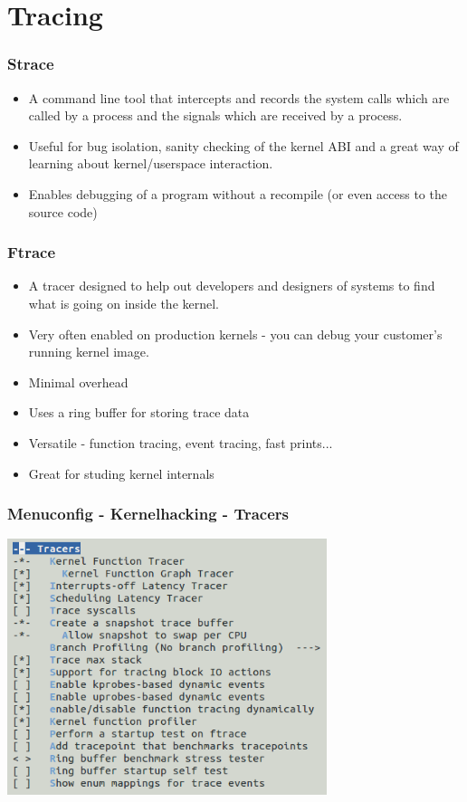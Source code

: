 \documentclass{beamer}
\begin{document}
\section{Tracing}

\begin{frame}
\frametitle{Strace}
\begin{itemize}
	\item A command line tool that intercepts and records the system calls which are called by a process and the signals which are received by a process.
	\item Useful for bug isolation, sanity checking of the kernel ABI and
a great way of learning about kernel/userspace interaction.
	\item Enables debugging of a program without a recompile (or even access to the source code)
\end{itemize}
\end{frame}

\begin{frame}
\frametitle{Ftrace}
\begin{itemize}
	\item A tracer designed to help out developers and
designers of systems to find what is going on inside the kernel.
	\item Very often enabled on production kernels - you can debug your customer's running kernel image.
	\item Minimal overhead
	\item Uses a ring buffer for storing trace data
	\item Versatile - function tracing, event tracing, fast prints...
	\item Great for studing kernel internals
\end{itemize}
\end{frame}

\begin{frame}
\frametitle{Menuconfig - Kernelhacking - Tracers}
\includegraphics[width=0.7\textwidth]{media/tracingmenuconfig.png}
\end{frame}
\end{document}
